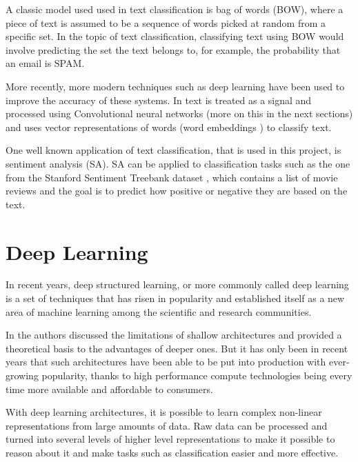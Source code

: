 A classic model used used in text classification is bag of words \cite{wallach2006topic} (BOW), where a piece of text is assumed to be a sequence of words picked at random from a specific set. In the topic of text classification, classifying text using BOW would involve predicting the set the text belongs to, for example, the probability that an email is SPAM.

More recently, more modern techniques such as deep learning have been used to improve the accuracy of these systems. In \cite{zhang2015character} text is treated as a signal and processed using Convolutional neural networks (more on this in the next sections) and \cite{DBLP:journals/corr/Kim14f} uses vector representations of words (word embeddings \cite{goldberg2014word2vec}) to classify text.

One well known application of text classification, that is used in this project, is sentiment analysis (SA). SA can be applied to classification tasks such as the one from the Stanford Sentiment Treebank dataset \cite{socher2013recursive}, which contains a list of movie reviews and the goal is to predict how positive or negative they are based on the text.


\section{Deep Learning} \label{sec:dnn}

In recent years, deep structured learning, or more commonly called deep learning is a set of techniques that has risen in popularity and established itself as a new area of machine learning among the scientific and research communities. \cite{deng2014deep}

In \cite{bengio2009learning} the authors discussed the limitations of shallow architectures and provided a theoretical basis to the advantages of deeper ones. But it has only been in recent years that such architectures have been able to be put into production with ever-growing popularity, thanks to high performance compute technologies being every time more available and affordable to consumers.

With deep learning architectures, it is possible to learn complex non-linear representations from large amounts of data. Raw data can be processed and turned into several levels of higher level representations to make it possible to reason about it and make tasks such as classification easier and more effective.

